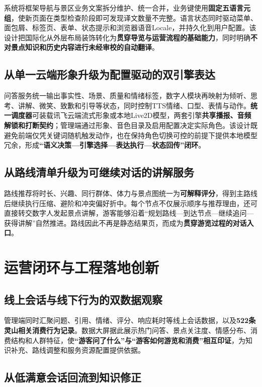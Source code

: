 系统将框架导航与景区业务文案拆分维护、统一合并，业务键使用\textbf{固定五语言元组}，使新页面在类型检查阶段即可发现译文数量不完整。语言状态同时驱动菜单、面包屑、标签页、表单、状态提示和浏览器语音Locale，并持久化到用户配置。该设计把国际化从外层布局装饰转化为\textbf{贯穿导览与运营流程的基础能力}，同时明确\textbf{不对景点知识和历史内容进行未经审校的自动翻译}。

\subsection{从单一云端形象升级为配置驱动的双引擎表达}

问答服务统一输出事实性、场景、质量和情绪标签，数字人模块再映射为倾听、思考、讲解、微笑、致歉和引导等状态，同时控制TTS情绪、口型、表情与动作。\textbf{统一调度器}可装载讯飞云端流式形象或本地Live2D模型，两套引擎\textbf{共享播报、音频解锁和打断契约}；管理端通过形象、音色目录及启用配置决定实际角色。该设计既避免前端仅凭关键词随机触发动作，也在保持角色切换可控的前提下提供本地模型冗余，形成\textbf{“语义决策—引擎选择—表达执行—状态回传”闭环}。

\subsection{从路线清单升级为可继续对话的讲解服务}

路线推荐将时长、兴趣、同行群体、体力与景点图统一为\textbf{可解释评分}，得到主路线后继续执行压缩、避阶和冲突偏好折中。每个节点不仅展示顺序与推荐理由，还可直接转交数字人发起景点讲解，游客能够沿着“规划路线—到达节点—继续追问—获得讲解”自然推进。路线因此不再是静态结果页，而成为\textbf{贯穿游览过程的对话入口}。

\endgroup
\newpage
\section{运营闭环与工程落地创新}

\subsection{线上会话与线下行为的双数据观察}

管理端同时汇聚问题、引用、情绪、评分、响应耗时等线上会话数据，以及\textbf{522条灵山相关消费行为记录}。数据大屏据此展示热门问答、景点关注度、情感分布、消费结构和人群特征，使\textbf{“游客问了什么”与“游客如何游览和消费”相互印证}，为知识补充、路线调整和服务资源配置提供依据。

\subsection{从低满意会话回流到知识修正}

